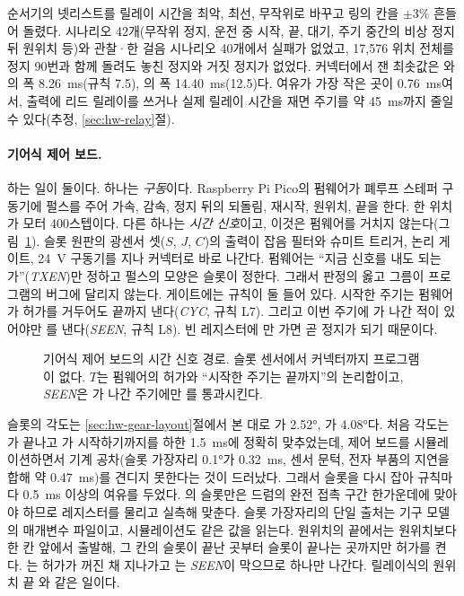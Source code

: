 순서기의 넷리스트를 릴레이 시간을 최악, 최선, 무작위로 바꾸고 링의 칸을 $\pm 3$\% 흔들어 돌렸다. 시나리오 42개(무작위
정지, 운전 중 시작, 끝, 대기, 주기 중간의 비상 정지 뒤 원위치 등)와 관찰·한 걸음 시나리오 40개에서 실패가 없었고,
17,576 위치 전체를 정지 90번과 함께 돌려도 놓친 정지와 거짓 정지가 없었다. 커넥터에서 잰 최솟값은 와
의 폭 8.26~ms(규칙 7.5), 의 폭 14.40~ms(12.5)다. 여유가 가장 작은 곳이 0.76~ms여서, 출력에
리드 릴레이를 쓰거나 실제 릴레이 시간을 재면 주기를 약 45~ms까지 줄일 수 있다(추정, \ref{sec:hw-relay}절).

\paragraph{기어식 제어 보드.} 하는 일이 둘이다. 하나는 \emph{구동}이다. Raspberry Pi Pico의 펌웨어가 폐루프 스테퍼
구동기에 펄스를 주어 가속, 감속, 정지 뒤의 되돌림, 재시작, 원위치, 끝을 한다. 한 위치가 모터 400스텝이다. 다른 하나는
\emph{시간 신호}이고, 이것은 펌웨어를 거치지 않는다(그림~\ref{fig:hw-gear-gate}). 슬롯 원판의 광센서 셋($S$, $J$, $C$)의
출력이 잡음 필터와 슈미트 트리거, 논리 게이트, 24~V 구동기를 지나 커넥터로 바로 나간다. 펌웨어는 ``지금 신호를 내도
되는가''(\textit{TXEN})만 정하고 펄스의 모양은 슬롯이 정한다. 그래서 판정의 옳고 그름이 프로그램의 버그에 달리지 않는다.
게이트에는 규칙이 둘 들어 있다. 시작한 주기는 펌웨어가 허가를 거두어도 끝까지 낸다(\textit{CYC}, 규칙 L7). 그리고 이번
주기에 가 나간 적이 있어야만 를 낸다(\textit{SEEN}, 규칙 L8). 빈 레지스터에 만 가면
곧 정지가 되기 때문이다.

\begin{figure}[ht]
\centering

\caption{기어식 제어 보드의 시간 신호 경로. 슬롯 센서에서 커넥터까지 프로그램이 없다. $T$는 펌웨어의 허가와 ``시작한
주기는 끝까지''의 논리합이고, \textit{SEEN}은 가 나간 주기에만 를 통과시킨다.}
\label{fig:hw-gear-gate}
\end{figure}

슬롯의 각도는 \ref{sec:hw-gear-layout}절에서 본 대로 가 2.52°, 가 4.08°다. 처음 각도는
가 끝나고 가 시작하기까지를 하한 1.5~ms에 정확히 맞추었는데, 제어 보드를 시뮬레이션하면서 기계
공차(슬롯 가장자리 0.1°가 0.32~ms, 센서 문턱, 전자 부품의 지연을 합해 약 0.47~ms)를 견디지 못한다는 것이 드러났다. 그래서
슬롯을 다시 잡아 규칙마다 0.5~ms 이상의 여유를 두었다. 의 슬롯만은 드럼의 완전 접촉 구간 한가운데에 맞아야
하므로 레지스터를 물리고 실측해 맞춘다. 슬롯 가장자리의 단일 출처는 기구 모델의 매개변수 파일이고, 시뮬레이션도 같은
값을 읽는다. 원위치의 끝에서는 원위치보다 한 칸 앞에서 출발해, 그 칸의  슬롯이 끝난 곳부터  슬롯이
끝나는 곳까지만 허가를 켠다. 는 허가가 꺼진 채 지나가고 는 \textit{SEEN}이 막으므로
 하나만 나간다. 릴레이식의 원위치 끝 와 같은 일이다.

